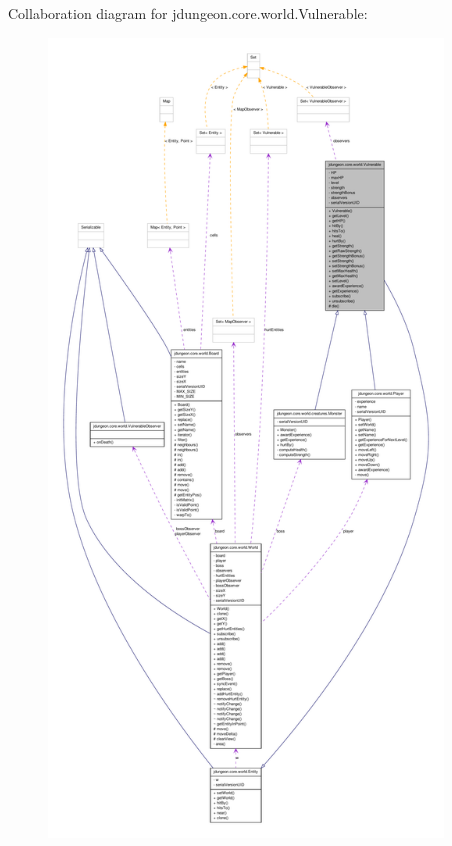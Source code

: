 Collaboration diagram for jdungeon.core.world.Vulnerable:
\nopagebreak
\begin{figure}[H]
\begin{center}
\leavevmode
\includegraphics[height=600pt]{classjdungeon_1_1core_1_1world_1_1_vulnerable__coll__graph}
\end{center}
\end{figure}
